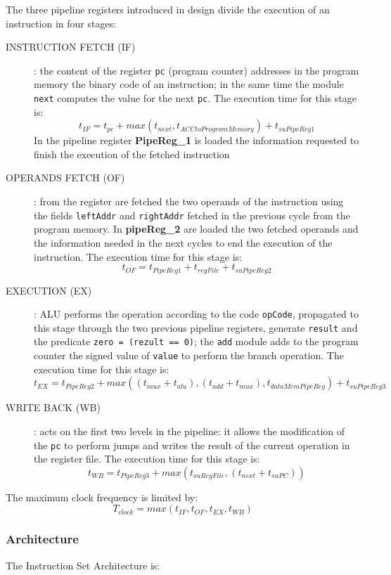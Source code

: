 The three pipeline registers introduced in design divide the execution of an instruction in four stages:
\begin{description}
    \item[INSTRUCTION FETCH (IF)]: the content of the register {\tt pc} (program counter) addresses in the program memory the binary code of an instruction; in the same time the module {\tt next} computes the value for the next {\tt pc}. The execution time for this stage is:
        $$t_{IF} = t_{pc} + max(t_{next}, t_{ACCto Program Memory}) + t_{suPipeReg1}$$
        In the pipeline register {\bf PipeReg\_1} is loaded the information requested to finish the execution of the fetched instruction
    \item[OPERANDS FETCH (OF)]: from the register are fetched the two operands of the instruction using the fields {\tt leftAddr} and {\tt rightAddr} fetched in the previous cycle from the program memory. In {\bf pipeReg\_2} are loaded the two fetched operands and the information needed in the next cycles to end the execution of the instruction. The execution time for this stage is:
        $$t_{OF} = t_{PipeReg1} + t_{regFile} + t_{suPipeReg2}$$
    \item[EXECUTION (EX)]: ALU performs the operation according to the code {\tt opCode}, propagated to this stage through the two previous  pipeline registers,  generate {\tt result} and the predicate {\tt zero = (rezult == 0)}; the {\tt add} module adds to the program counter the signed value of {\tt value} to perform the branch operation.  The execution time for this stage is:
        $$t_{EX} = t_{PipeReg2} + max((t_{mux}+t_{alu}),  (t_{add}+t_{mux}), t_{dataMemPipeReg}) + t_{suPipeReg3}$$
    \item[WRITE BACK (WB)]: acts on the first two levels in the pipeline: it allows the modification of the {\tt pc} to perform jumps and writes the result of the current operation in the register file. The execution time for this stage is:
        $$t_{WB} = t_{PipeReg3} +  max(t_{suRegFile}, (t_{next} + t_{suPC}))$$
\end{description}
The maximum clock frequency is limited by:
$$T_{clock} = max(t_{IF}, t_{OF}, t_{EX}, t_{WB})$$

\subsubsection{Architecture}


The Instruction Set Architecture is:


